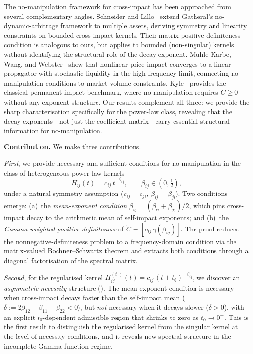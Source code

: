 \documentclass[12pt]{article}
\theoremstyle{definition}
\theoremstyle{remark}
\newcommand{\bC}{\widetilde{C}}
\begin{document}
The no-manipulation framework for cross-impact has been approached from several
complementary angles.  Schneider and Lillo~\cite{SchneiderLillo2019} extend
Gatheral's no-dynamic-arbitrage framework to multiple assets, deriving symmetry
and linearity constraints on bounded cross-impact kernels.  Their matrix
positive-definiteness condition is analogous to ours, but applies to bounded
(non-singular) kernels without identifying the structural role of the decay
exponent.  Muhle-Karbe, Wang, and Webster~\cite{MuhleKarbeWangWebster2024}
show that nonlinear price impact converges to a linear propagator with
stochastic liquidity in the high-frequency limit, connecting no-manipulation
conditions to market volume constraints.  Kyle~\cite{Kyle1985} provides
the classical permanent-impact benchmark, where no-manipulation requires
$C\ge 0$ without any exponent structure.  Our results complement all three:
we provide the sharp characterisation specifically for the power-law class,
revealing that the decay exponents---not just the coefficient matrix---carry
essential structural information for no-manipulation.

\medskip
\noindent\textbf{Contribution.}
We make three contributions.

\emph{First}, we provide necessary and sufficient conditions for no-manipulation
in the class of heterogeneous power-law kernels
\[
  H_{ij}(t) = c_{ij}\,t^{-\beta_{ij}},\qquad \beta_{ij}\in(0,\tfrac12),
\]
under a natural symmetry assumption ($c_{ij}=c_{ji}$, $\beta_{ij}=\beta_{ji}$).
Two conditions emerge: (a)~the \emph{mean-exponent condition}
$\beta_{ij} = (\beta_{ii}+\beta_{jj})/2$, which pins cross-impact decay
to the arithmetic mean of self-impact exponents; and (b)~the \emph{Gamma-weighted
positive definiteness} of $\bC = [c_{ij}\,\gamma(\beta_{ij})]$.
The proof reduces the nonnegative-definiteness problem to a frequency-domain
condition via the matrix-valued Bochner--Schwartz theorem and extracts both
conditions through a diagonal factorisation of the spectral matrix.

\emph{Second}, for the regularised kernel $H_{ij}^{(t_0)}(t) = c_{ij}\,(t+t_0)^{-\beta_{ij}}$,
we discover an \emph{asymmetric necessity} structure ().
The mean-exponent condition is necessary when cross-impact decays faster
than the self-impact mean ($\delta := 2\beta_{12} - \beta_{11} - \beta_{22} < 0$),
but \emph{not} necessary when it decays slower ($\delta > 0$), with an explicit
$t_0$-dependent admissible region that shrinks to zero as $t_0\to 0^+$.
This is the first result to distinguish the regularised kernel from the singular
kernel at the level of necessity conditions, and it reveals new spectral structure
in the incomplete Gamma function regime.
\end{document}
